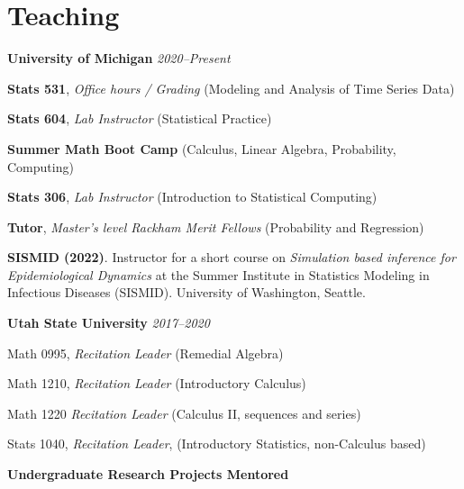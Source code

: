 \documentclass[11pt]{article}
\newenvironment {teachinglsit}
                {
                 \begin{list}{}
                 {\setlength{\labelwidth}{0mm}
                  \setlength{\leftmargin}{5mm}
                  \setlength{\labelsep}{0mm}
                  \setlength{\parsep}{0.1 ex}
                  \setlength{\itemsep}{1pt}
      \setlength{\topsep}{0.15cm}}} %
   {\end{list}}
\begin{document}
\hspace{5mm}{\it Award amount: $\$1000$}

\section*{Teaching}

\noindent \textbf{University of Michigan} \hfill  {\textit{2020--Present}}

\begin{teachinglsit}
    \item \textbf{Stats 531}, {\it Office hours / Grading} \hfill (Modeling and Analysis of Time Series Data)
    \item \textbf{Stats 604}, {\it Lab Instructor} \hfill (Statistical Practice)
    \item \textbf{Summer Math Boot Camp} \hfill (Calculus, Linear Algebra, Probability, Computing)
    \item \textbf{Stats 306}, {\it Lab Instructor} \hfill (Introduction to Statistical Computing)

    \item \textbf{Tutor}, {\it Master's level Rackham Merit Fellows} \hfill (Probability and Regression)
\end{teachinglsit}

\vspace{2mm}
\noindent \textbf{SISMID (2022)}. Instructor for a short course on {\it Simulation based inference for Epidemiological Dynamics} at the Summer Institute in Statistics Modeling in Infectious Diseases (SISMID). University of Washington, Seattle.

\vspace{2mm}
\noindent \textbf{Utah State University} \hfill  {\textit{2017--2020}}

\begin{teachinglsit}
    \item Math 0995, {\it Recitation Leader} (Remedial Algebra)
    \item Math 1210, {\it Recitation Leader} (Introductory Calculus)
    \item Math 1220 {\it Recitation Leader} (Calculus II, sequences and series)
    \item Stats 1040, {\it Recitation Leader}, (Introductory Statistics, non-Calculus based)
\end{teachinglsit}

\noindent \textbf{Undergraduate Research Projects Mentored}
\end{document}
